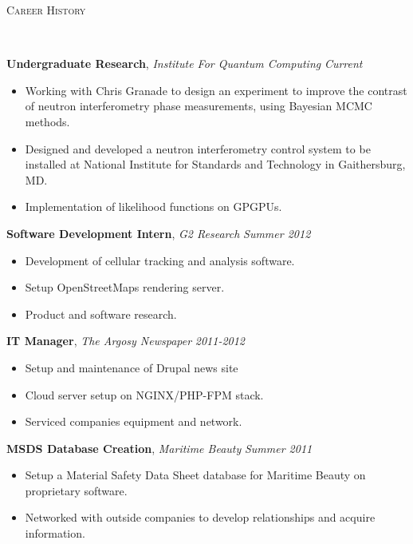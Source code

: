 \documentclass[9pt]{article}
\newenvironment{changemargin}[2]{%
  \begin{list}{}{%
    \setlength{\topsep}{0pt}%
    \setlength{\leftmargin}{#1}%
    \setlength{\rightmargin}{#2}%
    \setlength{\listparindent}{\parindent}%
    \setlength{\itemindent}{\parindent}%
    \setlength{\parsep}{\parskip}%
  }%
  \item[]}{\end{list}
}
\newcommand{\lineover}{
	\begin{changemargin}{-0.05in}{-0.05in}
		\vspace*{-8pt}
		\hrulefill \\
		\vspace*{-2pt}
	\end{changemargin}
}
\newcommand{\header}[1]{
	\begin{changemargin}{-0.5in}{-0.5in}
		\scshape{#1}\\
  	\lineover
	\end{changemargin}
}
\newenvironment{body} {
	\vspace*{-16pt}
	\begin{changemargin}{-0.25in}{-0.5in}
  }	
	{\end{changemargin}
}
\begin{document}
\smallskip


\header{Career History}

\begin{body}
	\vspace{14pt}
	\textbf{Undergraduate Research}, \emph{Institute For Quantum Computing} \hfill \emph{Current}\\
	\vspace*{-4pt}
	\begin{itemize} \itemsep -0pt  %
		\item Working with Chris Granade to design an experiment to improve the contrast of neutron interferometry phase measurements, using Bayesian MCMC methods.  
		\item Designed and developed a neutron interferometry control system to be installed at National Institute for Standards and Technology in Gaithersburg, MD.
		\item Implementation of likelihood functions on GPGPUs. 

	\end{itemize}
	\textbf{Software Development Intern}, \emph{G2 Research} \hfill \emph{Summer 2012}\\
	\vspace*{-4pt}
	\begin{itemize} \itemsep -0pt  %
		\item Development of cellular tracking and analysis software.
		\item Setup OpenStreetMaps rendering server.
		\item Product and software research.
	\end{itemize}

	\textbf {IT Manager}, \emph{The Argosy Newspaper} \hfill \emph{2011-2012}\\
	\vspace*{-4pt}
	\begin{itemize} \itemsep -0pt
		\item Setup and maintenance of Drupal news site
		\item Cloud server setup on NGINX/PHP-FPM stack. 
		\item Serviced companies equipment and network. 
	\end{itemize}

	\textbf {MSDS Database Creation}, \emph{Maritime Beauty} \hfill \emph{Summer 2011}\\
	\vspace*{-4pt}
	\begin{itemize} \itemsep -0pt
		\item Setup a Material Safety Data Sheet database for Maritime Beauty on proprietary software. 
		\item Networked with outside companies to develop relationships and acquire information. 
	\end{itemize}


\end{body}
\end{document}
